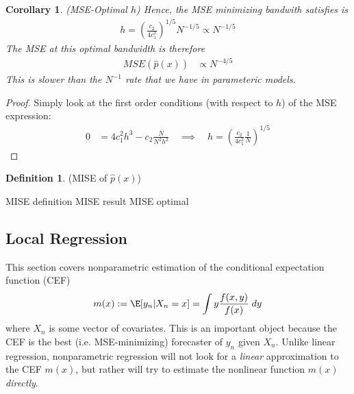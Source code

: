 \documentclass[12pt]{article}
\theoremstyle{plain}
\newtheorem{cor}[thm]{Corollary}
\theoremstyle{definition}
\newtheorem{defn}[thm]{Definition}
\theoremstyle{remark}
\begin{document}
\begin{cor}\emph{(MSE-Optimal $h$)}
Hence, the MSE minimizing bandwith satisfies is
\begin{align*}
  h
  =
  \left(
  \frac{c_2}{4c_1^2}
  \right)^{1/5}
  N^{-1/5}
  \propto
  N^{-1/5}
\end{align*}
The MSE at this optimal bandwidth is therefore
\begin{align*}
  MSE(\hat{p}(x))
  &\propto
  N^{-4/5}
\end{align*}
This is slower than the $N^{-1}$ rate that we have in parameteric
models.
\end{cor}
\begin{proof}
Simply look at the first order conditions (with respect to $h$) of the
MSE expression:
\begin{align*}
  0
  &=
  4c_1^2 h^3
  -
  c_2
  \frac{N}{N^2h^2}
  \quad\implies\quad
  h
  =
  \left(
  \frac{c_2}{4c_1^2}
  \frac{1}{N}
  \right)^{1/5}
\end{align*}
\end{proof}

\begin{defn}(MISE of $\hat{p}(x)$)
\end{defn}
MISE definition
MISE result
MISE optimal


\clearpage
\subsection{Local Regression}

This section covers nonparametric estimation of the conditional
expectation function (CEF)
\begin{align}
  m(x):=\E[y_n|X_n=x]
  =
  \int
  y
  \frac{f(x,y)}{f(x)}
  \;dy
  \label{CEF}
\end{align}
where $X_n$ is some vector of covariates. This is an important object
because the CEF is the best (i.e. MSE-minimizing) forecaster of $y_n$
given $X_n$.  Unlike linear regression, nonparametric regression will
not look for a \emph{linear} approximation to the CEF $m(x)$, but rather
will try to estimate the nonlinear function $m(x)$ \emph{directly}.
\end{document}
